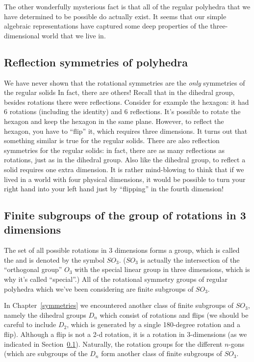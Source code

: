 The other wonderfully mysterious fact is that all of the regular polyhedra that we have determined to be possible do actually exist. It seems that our simple algebraic representations  have captured some deep properties of the three-dimensional world that we live in.

\subsection{Reflection symmetries of polyhedra}\label{subsec:reflSym}
We have never shown that the rotational symmetries are the \emph{only}  symmetries of the regular solids In fact, there are others! Recall that in the dihedral group, besides rotations there were reflections. Consider for example the hexagon: it had 6 rotations (including the identity) and 6 reflections. It's possible to rotate the hexagon and keep the hexagon in the same plane. However, to reflect the hexagon, you have to ``flip'' it, which requires three dimensions.  It turns out that something similar is true for the regular solids. There are also reflection symmetries for the regular solids: in fact, there are as many reflections as rotations, just as in the dihedral group. Also like the dihedral group, to reflect a solid requires one extra dimension. It is rather mind-blowing to think that if we lived in a world with four physical dimensions, it would be possible to turn your right hand into your left hand just by ``flipping'' in the fourth dimension!

\subsection{Finite subgroups of the group of rotations in 3 dimensions}
The set of all possible rotations in 3 dimensions forms a group, which is called the  and is denoted by the symbol $SO_3$. ($SO_3$ is actually the intersection of the ``orthogonal group'' $O_3$ with the special linear group in three dimensions, which is why it's called ``special''.)  All of  the rotational symmetry groups of regular polyhedra which we've been considering are finite subgroups of  $SO_3$. 

In Chapter~\ref{symmetries} we encountered another class of finite subgroups of $SO_3$, namely the dihedral groups $D_n$ which consist of rotations and flips (we should be careful to include $D_2$, which is generated by  a single 180-degree rotation and a flip). Although a flip is not a 2-d rotation, it is a rotation in 3-dimensions (as we indicated in  Section~\ref{subsec:reflSym}). Naturally, the rotation groups for the different $n$-gons (which are subgroups of the $D_n$ form another class of finite subgroups of $SO_3$.

